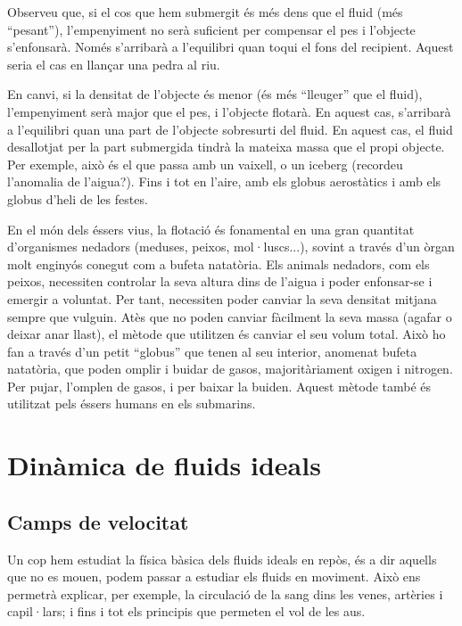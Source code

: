 \documentclass[12pt]{book}
\begin{document}
Observeu que, si el cos que hem submergit és més dens que el fluid (més ``pesant''), l'empenyiment no serà suficient per compensar el pes i l'objecte s'enfonsarà. Només s'arribarà a l'equilibri quan toqui el fons del recipient. Aquest seria el cas en llançar una pedra al riu.

En canvi, si la densitat de l'objecte és menor (és més ``lleuger'' que el fluid), l'empenyiment serà major que el pes, i l'objecte flotarà. En aquest cas, s'arribarà a l'equilibri quan una part de l'objecte sobresurti del fluid. En aquest cas, el fluid desallotjat per la part submergida tindrà la mateixa massa que el propi objecte. Per exemple, això és el que passa amb un vaixell, o un iceberg (recordeu l'anomalia de l'aigua?). Fins i tot en l'aire, amb els globus aerostàtics i amb els globus d'heli de les festes.

En el món dels éssers vius, la flotació és fonamental en una gran quantitat d'organismes nedadors (meduses, peixos, mol·luscs...), sovint a través d'un òrgan molt enginyós conegut com a bufeta natatòria. Els animals nedadors, com els peixos,  necessiten controlar la seva altura dins de l'aigua i poder enfonsar-se i emergir a voluntat. Per tant, necessiten poder canviar la seva densitat mitjana sempre que vulguin. Atès que no poden canviar fàcilment la seva massa (agafar o deixar anar llast), el mètode que utilitzen és canviar el seu volum total. Això ho fan a través d'un petit ``globus'' que tenen al seu interior, anomenat bufeta natatòria, que poden omplir i buidar de gasos, majoritàriament oxigen i nitrogen. Per pujar, l'omplen de gasos, i per baixar la buiden. Aquest mètode també és utilitzat pels éssers humans en els submarins.

\chapter{Dinàmica de fluids ideals}
\label{chap:Hidrodinamica}

\section{Camps de velocitat}

Un cop hem estudiat la física bàsica dels fluids ideals en repòs, és a dir aquells que no es mouen, podem passar a estudiar els fluids en moviment. Això ens permetrà explicar, per exemple, la circulació de la sang dins les venes, artèries i capil·lars; i fins i tot els principis que permeten el vol de les aus. 
\end{document}
